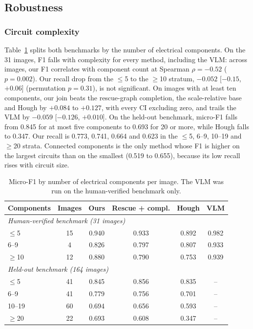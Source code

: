 \documentclass[journal]{IEEEtran}
\begin{document}
\subsection{Robustness}
\label{sec:robustness}

\subsubsection{Circuit complexity}
Table~\ref{tab:strata} splits both benchmarks by the number of electrical components. On the 31 images, F1 falls with complexity for every method, including the VLM: across images, our F1 correlates with component count at Spearman $\rho=-0.52$ ($p=0.002$). Our recall drop from the $\leq$5 to the $\geq$10 stratum, $-0.052$ [$-0.15$, $+0.06$] (permutation $p=0.31$), is not significant. On images with at least ten components, our join beats the rescue-graph completion, the scale-relative base and Hough by $+0.084$ to $+0.127$, with every CI excluding zero, and trails the VLM by $-0.059$ [$-0.126$, $+0.010$]. On the held-out benchmark, micro-F1 falls from 0.845 for at most five components to 0.693 for 20 or more, while Hough falls to 0.347. Our recall is 0.773, 0.741, 0.664 and 0.623 in the $\leq$5, 6--9, 10--19 and $\geq$20 strata. Connected components is the only method whose F1 is higher on the largest circuits than on the smallest (0.519 to 0.655), because its low recall rises with circuit size.

\begin{table}[t]
\caption{Micro-F1 by number of electrical components per image. The VLM was run on the human-verified benchmark only.}
\label{tab:strata}
\centering
\footnotesize
\setlength{\tabcolsep}{4pt}
\begin{tabular}{lccccc}
\toprule
\textbf{Components} & \textbf{Images} & \textbf{Ours} & \textbf{Rescue + compl.} & \textbf{Hough} & \textbf{VLM} \\
\midrule
\multicolumn{6}{l}{\emph{Human-verified benchmark (31 images)}} \\
$\leq$5 & 15 & 0.940 & 0.933 & 0.892 & 0.982 \\
6--9 & 4 & 0.826 & 0.797 & 0.807 & 0.933 \\
$\geq$10 & 12 & 0.880 & 0.790 & 0.753 & 0.939 \\
\midrule
\multicolumn{6}{l}{\emph{Held-out benchmark (164 images)}} \\
$\leq$5 & 41 & 0.845 & 0.856 & 0.835 & -- \\
6--9 & 41 & 0.779 & 0.756 & 0.701 & -- \\
10--19 & 60 & 0.694 & 0.656 & 0.593 & -- \\
$\geq$20 & 22 & 0.693 & 0.608 & 0.347 & -- \\
\bottomrule
\end{tabular}
\end{table}
\end{document}

